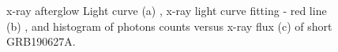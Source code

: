 \begin{figure}[hpbt]
\caption{x-ray  afterglow Light curve (a) , x-ray  light curve fitting - red line (b) , and histogram  of  photons counts  versus x-ray flux  (c)  of short GRB190627A.}
\end{figure}\\\\
